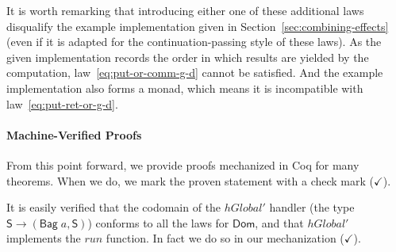 \documentclass{jfp}
\newcommand{\Conid}[1]{\mathit{#1}}
\newcommand{\Varid}[1]{\mathit{#1}}
\let\Varid\mathit
\let\Conid\mathsf
\begin{document}

It is worth remarking that introducing either one of these additional laws
disqualify the example implementation given in
Section~\ref{sec:combining-effects} (even if it is adapted for the
continuation-passing style of these laws).
As the given implementation records the order in which results are yielded by
the computation, law~\eqref{eq:put-or-comm-g-d} cannot be satisfied.
And the example implementation also forms a monad, which means it is incompatible with
law~\eqref{eq:put-ret-or-g-d}.

\paragraph{Machine-Verified Proofs}
From this point forward, we provide proofs mechanized in Coq for many theorems.
When we do, we mark the proven statement with a check mark ($\checkmark$).

It is easily verified that the codomain of the \ensuremath{\Varid{hGlobal'}} handler (the
type \ensuremath{\Conid{S}\to (\Conid{Bag}\;\Varid{a},\Conid{S})}) conforms to all the laws for \ensuremath{\Conid{Dom}}, and that \ensuremath{\Varid{hGlobal'}}
implements the \ensuremath{\Varid{run}} function. In fact we do so in our mechanization
($\checkmark$).
\end{document}
